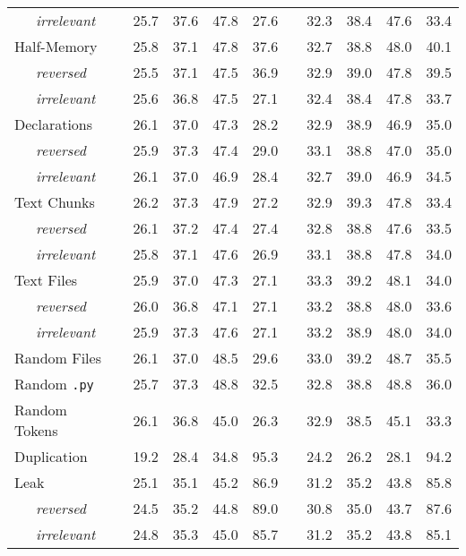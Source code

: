 \documentclass{standalone}
\begin{document}
\begin{table}
{\begin{tabular}{lc cc>{\columncolor{gray!30}}cc c cc>{\columncolor{gray!30}}cc}
        ~~~\textit{irrelevant} & & 25.7 & 37.6 & 47.8 & 27.6 & & 32.3 & 38.4 & 47.6 & 33.4 \\
        \cmidrule(lr){1-1}
        Half-Memory & & 25.8 & 37.1 & 47.8 & 37.6 & & 32.7 & 38.8 & 48.0 & 40.1 \\
        ~~~\textit{reversed} & & 25.5 & 37.1 & 47.5 & 36.9 & & 32.9 & 39.0 & 47.8 & 39.5 \\
        ~~~\textit{irrelevant} & & 25.6 & 36.8 & 47.5 & 27.1 & & 32.4 & 38.4 & 47.8 & 33.7 \\
        \cmidrule(lr){1-1}
        Declarations & & 26.1 & 37.0 & 47.3 & 28.2 & & 32.9 & 38.9 & 46.9 & 35.0 \\
        ~~~\textit{reversed} & & 25.9 & 37.3 & 47.4 & 29.0 & & 33.1 & 38.8 & 47.0 & 35.0 \\
        ~~~\textit{irrelevant} & & 26.1 & 37.0 & 46.9 & 28.4 & & 32.7 & 39.0 & 46.9 & 34.5 \\
        \cmidrule(lr){1-1}
        Text Chunks & & 26.2 & 37.3 & 47.9 & 27.2 & & 32.9 & 39.3 & 47.8 & 33.4 \\
        ~~~\textit{reversed} & & 26.1 & 37.2 & 47.4 & 27.4 & & 32.8 & 38.8 & 47.6 & 33.5 \\
        ~~~\textit{irrelevant} & & 25.8 & 37.1 & 47.6 & 26.9 & & 33.1 & 38.8 & 47.8 & 34.0 \\
        \cmidrule(lr){1-1}
        Text Files & & 25.9 & 37.0 & 47.3 & 27.1 & & 33.3 & 39.2 & 48.1 & 34.0 \\
        ~~~\textit{reversed} & & 26.0 & 36.8 & 47.1 & 27.1 & & 33.2 & 38.8 & 48.0 & 33.6 \\
        ~~~\textit{irrelevant} & & 25.9 & 37.3 & 47.6 & 27.1 & & 33.2 & 38.9 & 48.0 & 34.0 \\
        \cmidrule(lr){1-1}
        Random Files & & 26.1 & 37.0 & 48.5 & 29.6 & & 33.0 & 39.2 & 48.7 & 35.5 \\
        Random \texttt{.py} & & 25.7 & 37.3 & 48.8 & 32.5 & & 32.8 & 38.8 & 48.8 & 36.0 \\
        Random Tokens & & 26.1 & 36.8 & 45.0 & 26.3 & & 32.9 & 38.5 & 45.1 & 33.3 \\
        \midrule
        Duplication & & 19.2 & 28.4 & 34.8 & 95.3 & & 24.2 & 26.2 & 28.1 & 94.2 \\
        Leak & & 25.1 & 35.1 & 45.2 & 86.9 & & 31.2 & 35.2 & 43.8 & 85.8 \\
        ~~~\textit{reversed} & & 24.5 & 35.2 & 44.8 & 89.0 & & 30.8 & 35.0 & 43.7 & 87.6 \\
        ~~~\textit{irrelevant} & & 24.8 & 35.3 & 45.0 & 85.7 & & 31.2 & 35.2 & 43.8 & 85.1 \\
        
        \bottomrule
    \end{tabular}
}
\end{table}
\end{document}
